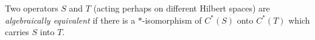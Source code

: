 Two operators $S$ and $T$ (acting perhaps on different Hilbert spaces) are \emph{algebraically equivalent} if there is a $\ast$-isomorphism of $C^*(S)$ onto $C^*(T)$ which carries $S$ into $T$.
